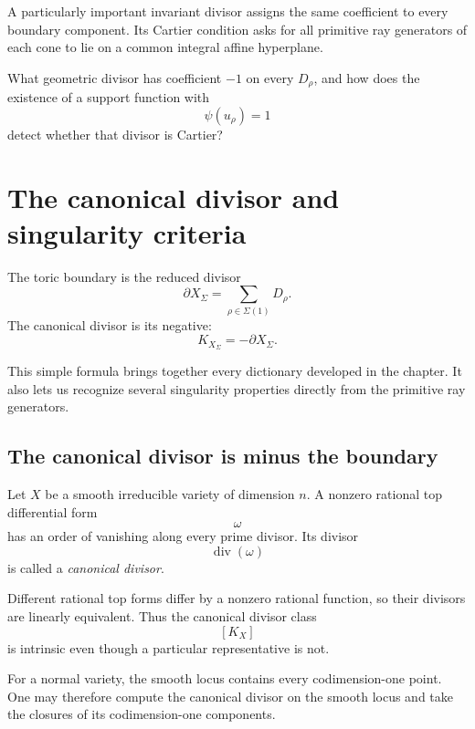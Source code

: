 A particularly important invariant divisor assigns the same
coefficient to every boundary component. Its Cartier condition asks
for all primitive ray generators of each cone to lie on a common
integral affine hyperplane.

\begin{guidingquestion}
What geometric divisor has coefficient \(-1\) on every
\(D_\rho\), and how does the existence of a support function with
\[
\psi(u_\rho)=1
\]
detect whether that divisor is Cartier?
\end{guidingquestion}


\section{The canonical divisor and singularity criteria}
\label{sec:canonical-divisor-singularity-criteria}

The toric boundary is the reduced divisor
\[
\partial X_\Sigma
=
\sum_{\rho\in\Sigma(1)}D_\rho.
\]
The canonical divisor is its negative:
\[
K_{X_\Sigma}
=
-\partial X_\Sigma.
\]

This simple formula brings together every dictionary developed in the
chapter. It also lets us recognize several singularity properties
directly from the primitive ray generators.

\subsection{The canonical divisor is minus the boundary}

\begin{agcheatsheet}
Let \(X\) be a smooth irreducible variety of dimension \(n\). A
nonzero rational top differential form
\[
\omega
\]
has an order of vanishing along every prime divisor. Its divisor
\[
\operatorname{div}(\omega)
\]
is called a \emph{canonical divisor}.

Different rational top forms differ by a nonzero rational function,
so their divisors are linearly equivalent. Thus the canonical divisor
class
\[
[K_X]
\]
is intrinsic even though a particular representative is not.

For a normal variety, the smooth locus contains every codimension-one
point. One may therefore compute the canonical divisor on the smooth
locus and take the closures of its codimension-one components.
\end{agcheatsheet}

